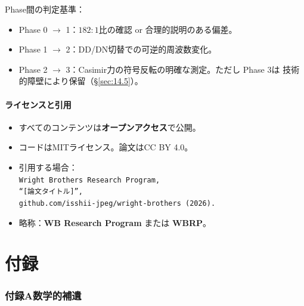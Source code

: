 \documentclass[11pt,a4paper]{article}
\begin{document}
\noindent
Phase間の判定基準：
\begin{itemize}
\item Phase 0 $\to$ 1：$182:1$比の確認 or 合理的説明のある偏差。
\item Phase 1 $\to$ 2：DD/DN切替での可逆的周波数変化。
\item Phase 2 $\to$ 3：Casimir力の符号反転の明確な測定。ただし Phase 3は
技術的障壁により保留（\S\ref{sec:14.5}）。
\end{itemize}


\subsection{ライセンスと引用}
\label{sec:16.5}

\begin{tcolorbox}[colback=green!5!white, colframe=green!60!black, title=ライセンスと引用]
\begin{itemize}
\item すべてのコンテンツは\textbf{オープンアクセス}で公開。
\item コードはMITライセンス。論文はCC BY 4.0。
\item 引用する場合：\\
\texttt{Wright Brothers Research Program, \\
``[論文タイトル]'', \\
github.com/isshii-jpeg/wright-brothers (2026).}
\item 略称：\textbf{WB Research Program} または \textbf{WBRP}。
\end{itemize}
\end{tcolorbox}



\newpage
\appendix
\part*{付録}



\section{付録A\quad 数学的補遺}
\label{app:math}
\end{document}
